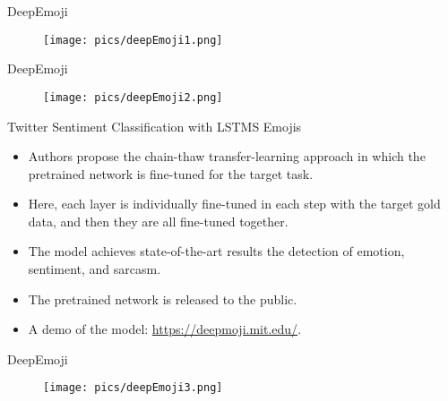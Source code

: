 \documentclass[handout]{beamer}
\begin{document}
\begin{frame}{DeepEmoji}
  \begin{figure}[h]
        	\texttt{[image: pics/deepEmoji1.png]}
        \end{figure}    
        
\end{frame}




\begin{frame}{DeepEmoji}
   
    \begin{figure}[h]
        	\texttt{[image: pics/deepEmoji2.png]}
        \end{figure}       
        
\end{frame}




\begin{frame}{Twitter Sentiment Classification with LSTMS Emojis}
\begin{scriptsize}
\begin{itemize}
\item Authors propose the chain-thaw transfer-learning approach in which the pretrained network is fine-tuned for the target task. 
\item Here, each layer is individually fine-tuned in each step with the target gold data, and then they are all fine-tuned together. 
\item The model achieves state-of-the-art results the detection of emotion, sentiment, and sarcasm. 
\item  The pretrained network is released to the public.

\item  A demo of the model: \url{https://deepmoji.mit.edu/}.
\end{itemize}
\end{scriptsize}
\end{frame}


\begin{frame}{DeepEmoji}
        
         \begin{figure}[h]
        	\texttt{[image: pics/deepEmoji3.png]}
        \end{figure}        
        
\end{frame}
\end{document}
